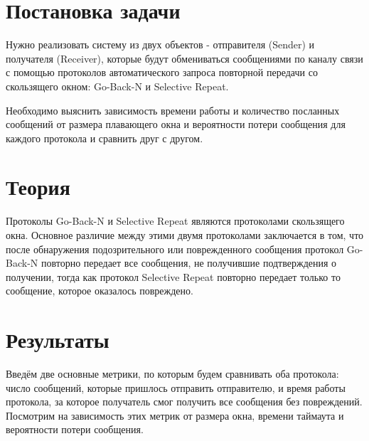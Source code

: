 \documentclass[a4paper,12pt]{article}
\begin{document}
    
    \newpage

    \tableofcontents
    \listoffigures
    \newpage

    \section{Постановка задачи}
    \quad Нужно реализовать систему из двух объектов - отправителя (Sender) и получателя (Receiver),
    которые будут обмениваться сообщениями по каналу связи с помощью протоколов автоматического запроса повторной передачи
    со скользящего окном: Go-Back-N и Selective Repeat.

    Необходимо выяснить зависимость времени работы и количество посланных сообщений от размера плавающего окна 
    и вероятности потери сообщения для каждого протокола и сравнить друг с другом.

    \label{s:theory}
    \section{Теория} 
    \quad Протоколы Go-Back-N и Selective Repeat являются протоколами скользящего окна.
    Основное различие между этими двумя протоколами заключается в том, что после обнаружения подозрительного или поврежденного сообщения
    протокол Go-Back-N повторно передает все сообщения, не получившие подтверждения о получении,
    тогда как протокол Selective Repeat повторно передает только то сообщение, которое оказалось повреждено.

    \section{Результаты}
    \quad Введём две основные метрики, по которым будем сравнивать оба протокола:
    число сообщений, которые пришлось отправить отправителю, 
    и время работы протокола, за которое получатель смог получить все сообщения без повреждений.
    Посмотрим на зависимость этих метрик от 
    размера окна, времени таймаута и вероятности потери сообщения.
    
\end{document}
